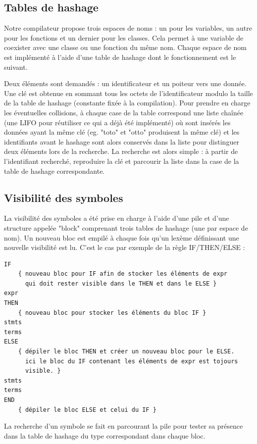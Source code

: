 \documentclass[12pt]{article}
\begin{document}
\subsection{Tables de hashage}

Notre compilateur propose trois espaces de noms : un pour les
variables, un autre pour les fonctions et un dernier pour les classes. Cela
permet à une variable de coexister avec une classe ou une fonction du même
nom. Chaque espace de nom est implémenté à l'aide d'une table de hashage dont
le fonctionnement est le suivant.

Deux éléments sont demandés : un identificateur et un poiteur vers une donnée.
Une clé est obtenue en sommant tous les octets de l'identificateur modulo la
taille de la table de hashage (constante fixée à la compilation). Pour prendre
en charge les éventuelles collisions, à chaque case de la table correspond une
liste chaînée (une LIFO pour réutiliser ce qui a déjà été implémenté) où sont
insérés les données ayant la même clé (eg. "toto" et "otto" produisent la même
clé) et les identifiants avant le hashage sont alors conservés dans la liste
pour distinguer deux éléments lors de la recherche. La recherche est alors
simple : à partir de l'identifiant recherché, reproduire la clé et parcourir
la liste dans la case de la table de hashage correspondante.


\subsection{Visibilité des symboles}

La visibilité des symboles a été prise en charge à l'aide d'une pile et d'une
structure appelée "block" comprenant trois tables de hashage (une par espace
de nom). Un nouveau bloc est empilé à chaque fois qu'un lexème définissant une
nouvelle visibilité est lu. C'est le cas par exemple de la règle IF/THEN/ELSE
:

\begin{verbatim}
IF
    { nouveau bloc pour IF afin de stocker les éléments de expr
      qui doit rester visible dans le THEN et dans le ELSE }
expr
THEN
    { nouveau bloc pour stocker les éléments du bloc IF }
stmts
terms
ELSE
    { dépiler le bloc THEN et créer un nouveau bloc pour le ELSE.
      ici le bloc du IF contenant les éléments de expr est tojours
      visible. }
stmts
terms
END
    { dépiler le bloc ELSE et celui du IF }
\end{verbatim}


La recherche d'un symbole se fait en parcourant la pile pour
tester sa présence dans la table de hashage du type correspondant dans chaque
bloc.
\end{document}
